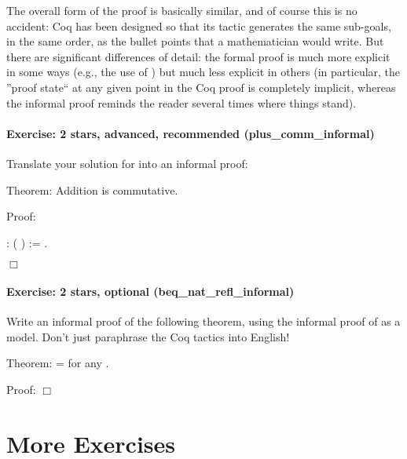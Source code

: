 \documentclass[12pt]{report}
\begin{document}
 The overall form of the proof is basically similar, and of
    course this is no accident: Coq has been designed so that its
     tactic generates the same sub-goals, in the same
    order, as the bullet points that a mathematician would write.  But
    there are significant differences of detail: the formal proof is
    much more explicit in some ways (e.g., the use of )
    but much less explicit in others (in particular, the ''proof state``
    at any given point in the Coq proof is completely implicit,
    whereas the informal proof reminds the reader several times where
    things stand). 

\paragraph{Exercise: 2 stars, advanced, recommended (plus\_comm\_informal)}

 Translate your solution for  into an informal proof:


    Theorem: Addition is commutative.


    Proof: \begin{coqdoccode}
\coqdocemptyline
\coqdocnoindent
{}  :  (  ) := .\coqdoceol
\end{coqdoccode}
\ensuremath{\Box} 

\paragraph{Exercise: 2 stars, optional (beq\_nat\_refl\_informal)}

 Write an informal proof of the following theorem, using the
    informal proof of  as a model.  Don't just
    paraphrase the Coq tactics into English!


    Theorem:  =    for any .


    Proof:  \ensuremath{\Box} \begin{coqdoccode}
\coqdocemptyline
\end{coqdoccode}
\section{More Exercises}
\end{document}
